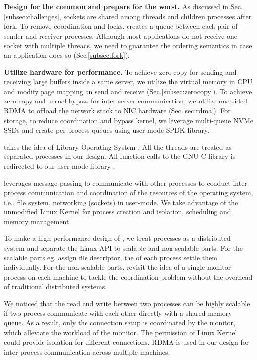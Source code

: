 \textbf{Design for the common and prepare for the worst.}
As discussed in Sec.\ref{subsec:challenges}, sockets are shared among threads and children processes after fork. To remove coordination and locks, \libipc creates a queue between each pair of sender and receiver processes. Although most applications do not receive one socket with multiple threads, we need to guarantee the ordering semantics in case an application does so (Sec.\ref{subsec:fork}).

\textbf{Utilize hardware for performance.}
To achieve zero-copy for sending and receiving large buffers inside a same server, we utilize the virtual memory in CPU and modify page mapping on send and receive (Sec.\ref{subsec:zerocopy}). To achieve zero-copy and kernel-bypass for inter-server communication, we utilize one-sided RDMA to offload the network stack to NIC hardware (Sec.\ref{sec:rdma}). For storage, to reduce coordination and bypass kernel, we leverage multi-queue NVMe SSDs and create per-process queues using user-mode SPDK library.


\sys takes the idea of Library Operating System . All the threads are treated as separated processes in our design. All function calls to the GNU C library is redirected to our user-mode library \libipc.

\libipc leverages message passing to communicate with other processes to conduct inter-process communication and coordination of the resources of the operating system, i.e., file system, networking (sockets) in user-mode. We take advantage of the unmodified Linux Kernel for process creation and isolation, scheduling and memory management.

To make a high performance design of \libipc, we treat processes as a distributed system and separate the Linux API to scalable and non-scalable parts. For the scalable parts eg. assign file descriptor, the \libipc of each process settle them individually. For the non-scalable parts, \libipc revisit the idea of a single monitor process on each machine to tackle the coordination problem without the overhead of traditional distributed systems.

We noticed that the read and write between two processes can be highly scalable if two process communicate with each other directly with a shared memory queue. As a result, only the connection setup is coordinated by the monitor, which alleviate the workload of the monitor. The permission of Linux Kernel could provide isolation for different connections. RDMA is used in our design for inter-process communication across multiple machines.

